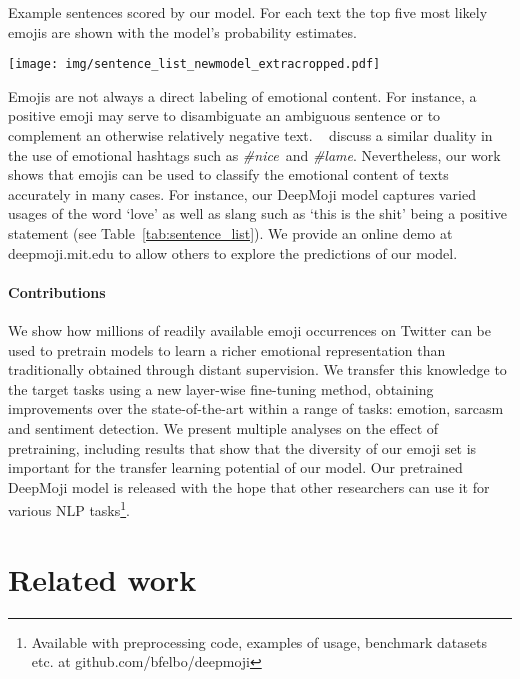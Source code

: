 \documentclass[11pt,a4paper]{article}
\begin{document}
\begin{table}[htp]
\caption{Example sentences scored by our model. For each text the top five most likely emojis are shown with the model's probability estimates.}
\label{tab:sentence_list}
\begin{center}
\texttt{[image: img/sentence\_list\_newmodel\_extracropped.pdf]}
\end{center}
\end{table}

Emojis are not always a direct labeling of emotional content. For instance, a positive emoji may serve to disambiguate an ambiguous sentence or to complement an otherwise relatively negative text. ~\citet{kunneman2014predictability} discuss a similar duality in the use of emotional hashtags such as {\em \#nice}~and {\em \#lame}. Nevertheless, our work shows that emojis can be used to classify the emotional content of texts accurately in many cases. For instance, our DeepMoji model captures varied usages of the word `love' as well as slang such as `this is the shit' being a positive statement (see Table~\ref{tab:sentence_list}). We provide an online demo at deepmoji.mit.edu to allow others to explore the predictions of our model. 

\paragraph{Contributions} 
We show how millions of readily available emoji occurrences on Twitter can be used to pretrain models to learn a richer emotional representation than traditionally obtained through distant supervision. We transfer this knowledge to the target tasks using a new layer-wise fine-tuning method, obtaining improvements over the state-of-the-art within a range of tasks: emotion, sarcasm and sentiment detection. We present multiple analyses on the effect of pretraining, including results that show that the diversity of our emoji set is important for the transfer learning potential of our model. Our pretrained DeepMoji model is released with the hope that other researchers can use it for various NLP tasks\footnote{Available with preprocessing code, examples of usage, benchmark datasets etc. at github.com/bfelbo/deepmoji}.

\section{Related work}
\label{sec:related_work}
\end{document}
